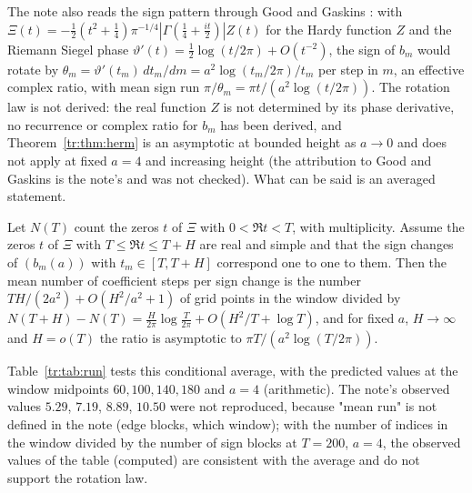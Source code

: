 The note also reads the sign pattern through Good and Gaskins \cite{GoodGaskins80}: with $\Xi(t)=-\frac12(t^2+\frac14)\pi^{-1/4}|\Gamma(\frac14+\frac{it}2)|Z(t)$ for the Hardy function $Z$ and the Riemann Siegel phase $\vartheta'(t)=\frac12\log(t/2\pi)+O(t^{-2})$, the sign of $b_m$ would rotate by $\theta_m=\vartheta'(t_m)\,dt_m/dm=a^2\log(t_m/2\pi)/t_m$ per step in $m$, an effective complex ratio, with mean sign run $\pi/\theta_m=\pi t/(a^2\log(t/2\pi))$. The rotation law is not derived: the real function $Z$ is not determined by its phase derivative, no recurrence or complex ratio for $b_m$ has been derived, and Theorem~\ref{tr:thm:herm} is an asymptotic at bounded height as $a\to0$ and does not apply at fixed $a=4$ and increasing height (the attribution to Good and Gaskins is the note's and was not checked).
What can be said is an averaged statement.

\begin{proposition}\label{tr:prop:run}
Let $N(T)$ count the zeros $t$ of $\Xi$ with $0<\Re t<T$, with multiplicity. Assume the zeros $t$ of $\Xi$ with $T\le\Re t\le T+H$ are real and simple and that the sign changes of $(b_m(a))$ with $t_m\in[T,T+H]$ correspond one to one to them. Then the mean number of coefficient steps per sign change is the number $TH/(2a^2)+O(H^2/a^2+1)$ of grid points in the window divided by $N(T+H)-N(T)=\frac{H}{2\pi}\log\frac T{2\pi}+O(H^2/T+\log T)$, and for fixed $a$, $H\to\infty$ and $H=o(T)$ the ratio is asymptotic to $\pi T/(a^2\log(T/2\pi))$.
\end{proposition}

Table~\ref{tr:tab:run} tests this conditional average, with the predicted values at the window midpoints $60,100,140,180$ and $a=4$ (arithmetic). The note's observed values $5.29$, $7.19$, $8.89$, $10.50$ were not reproduced, because "mean run" is not defined in the note (edge blocks, which window); with the number of indices in the window divided by the number of sign blocks at $T=200$, $a=4$, the observed values of the table (computed) are consistent with the average and do not support the rotation law.

\begin{table}[h]\centering\small
{}
\caption{Mean sign runs of $b_m(4)$ (computed).}\label{tr:tab:run}
\end{table}

